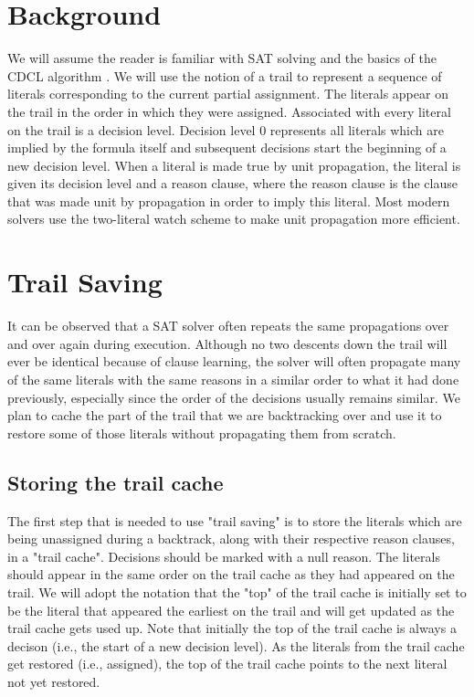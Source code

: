 \documentclass{article}
\begin{document}
\section{Background}
We will assume the reader is familiar with SAT solving and the basics of the CDCL algorithm \cite{DBLP:series/faia/SilvaLM09}. We will use the notion of a trail to represent a sequence of literals corresponding to the current partial assignment. The literals appear on the trail in the order in which they were assigned. Associated with every literal on the trail is a decision level. Decision level 0 represents all literals which are implied by the formula itself and subsequent decisions start the beginning of a new decision level. When a literal is made true by unit propagation, the literal is given its decision level and a reason clause, where the reason clause is the clause that was made unit by propagation in order to imply this literal. Most modern solvers use the two-literal watch scheme to make unit propagation more efficient.

\section{Trail Saving}
It can be observed that a SAT solver often repeats the same propagations over and over again during execution. Although no two descents down the trail will ever be identical because of clause learning, the solver will often propagate many of the same literals with the same reasons in a similar order to what it had done previously, especially since the order of the decisions usually remains similar. We plan to cache the part of the trail that we are backtracking over and use it to restore some of those literals without propagating them from scratch.

\subsection{Storing the trail cache}
The first step that is needed to use "trail saving" is to store the literals which are being unassigned during a backtrack, along with their respective reason clauses, in a "trail cache". Decisions should be marked with a null reason. The literals should appear in the same order on the trail cache as they had appeared on the trail. We will adopt the notation that the "top" of the trail cache is initially set to be the literal that appeared the earliest on the trail and will get updated as the trail cache gets used up. Note that initially the top of the trail cache is always a decison (i.e., the start of a new decision level). As the literals from the trail cache get restored (i.e., assigned), the top of the trail cache points to the next literal not yet restored.
\end{document}
